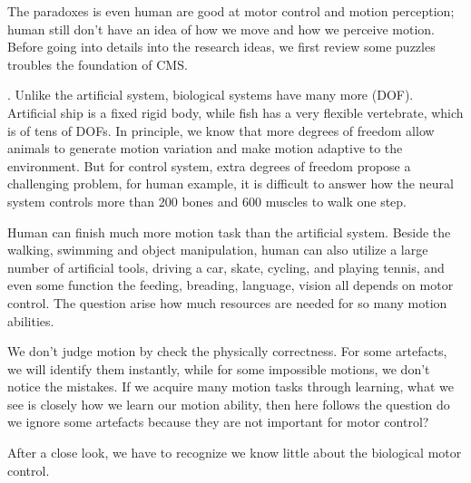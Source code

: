 The paradoxes is even human are good at motor control and motion perception; human still don’t have an idea of how we move and how we perceive motion.
Before going into details into the research ideas, we first review some puzzles troubles the foundation of CMS. 
\begin{itemize}
. Unlike the artificial system, biological systems have many more (DOF). Artificial ship is a fixed rigid body, while fish has a very flexible vertebrate, which is of tens of DOFs. In principle, we know that more degrees of freedom allow animals to generate motion variation and make motion adaptive to the environment. But for control system, extra degrees of freedom propose a challenging problem, for human example, it is difficult to answer how the neural  system controls more than 200 bones and 600 muscles to walk one step.
 
Human can finish much more motion task than the artificial system.
Beside the walking, swimming and object manipulation, human can also utilize a large number of artificial tools, driving a car, skate, cycling, and playing tennis, and even some function the feeding, breading, language, vision all depends on motor control. 
The  question arise how much resources are needed for so many motion abilities.

We don’t judge motion by check the physically correctness.
For some artefacts, we will identify them instantly, while for some impossible motions, we don’t notice the mistakes. 
If we acquire many motion tasks through learning, what we see is closely how we learn our motion ability, then here follows the  question do we ignore some artefacts because they are not important for motor control?
\end{itemize}
After a close look, we have to recognize we know little about the biological motor control.


